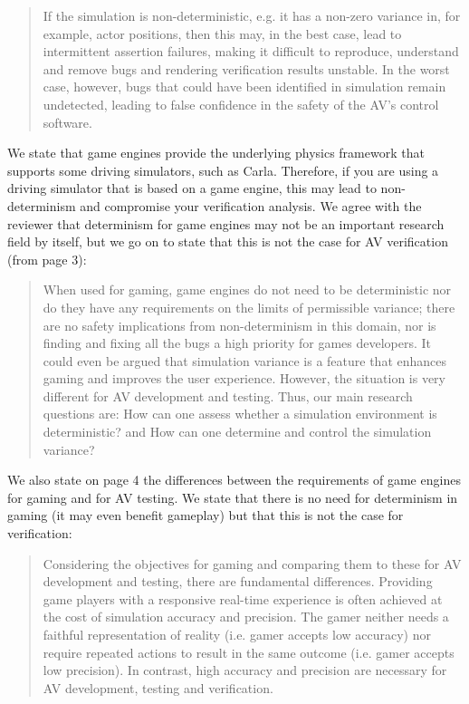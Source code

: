 \documentclass[11pt, a4paper]{letter} %
\begin{document}
\begin{letter}
\begin{quote}
If the simulation is non-deterministic, e.g. it has a non-zero variance in, for example, actor positions, then this may, in the best case, lead to intermittent assertion failures, making it difficult to reproduce, understand and remove bugs and rendering verification results unstable. In the worst case, however, bugs that could have been identified in simulation remain undetected, leading to false confidence in the safety of the AV’s control software.
\end{quote}

We state that game engines provide the underlying physics framework that supports some driving simulators, such as Carla. Therefore, if you are using a driving simulator that is based on a game engine, this may lead to non-determinism and compromise your verification analysis. We agree with the reviewer that determinism for game engines may not be an important research field by itself, but we go on to state that this is not the case for AV verification (from page 3):  

\begin{quote}
When used for gaming, game engines do not need to be deterministic nor do they have any requirements on the limits of permissible variance; there are no safety implications from non-determinism in this domain, nor is finding and fixing all the bugs a high priority for games developers. It could even be argued that simulation variance is a feature that enhances gaming and improves the user experience. However, the situation is very different for AV development and testing. Thus, our main research questions are: How can one assess whether a simulation environment is deterministic? and How can one determine and control the simulation variance? 
\end{quote}

We also state on page 4 the differences between the requirements of game engines for gaming and for AV testing. We state that there is no need for determinism in gaming (it may even benefit gameplay) but that this is not the case for verification: 

\begin{quote}
Considering the objectives for gaming and comparing them to these for AV development and testing, there are fundamental differences. Providing game players with a responsive real-time experience is often achieved at the cost of simulation accuracy and precision. The gamer neither needs a faithful representation of reality (i.e. gamer accepts low accuracy) nor require repeated actions to result in the same outcome (i.e. gamer accepts low precision). In contrast, high accuracy and precision are necessary for AV development, testing and verification.
\end{quote}


\end{letter}
\end{document}
